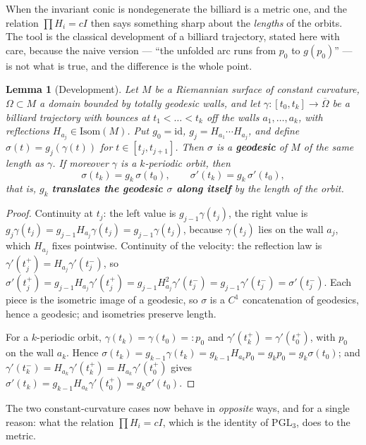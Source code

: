 \documentclass[11pt,a4paper]{article}
\theoremstyle{plain}
\newtheorem{lemma}[theorem]{Lemma}
\theoremstyle{definition}
\theoremstyle{remark}
\newcommand{\PGL}{\mathrm{PGL}}
\begin{document}
When the invariant conic is nondegenerate the billiard is a metric one, and the
relation $\prod H_i=cI$ then says something sharp about the \emph{lengths} of the
orbits. The tool is the classical development of a billiard trajectory, stated here
with care, because the naive version --- ``the unfolded arc runs from $p_0$ to
$g(p_0)$'' --- is not what is true, and the difference is the whole point.

\begin{lemma}[Development]\label{lem:develop}
Let $M$ be a Riemannian surface of constant curvature, $\Omega\subset M$ a domain
bounded by totally geodesic walls, and let $\gamma:[t_0,t_k]\to\overline\Omega$ be a
billiard trajectory with bounces at $t_1<\dots<t_k$ off the walls $a_1,\dots,a_k$,
with reflections $H_{a_j}\in\mathrm{Isom}(M)$. Put $g_0=\mathrm{id}$,
$g_j=H_{a_1}\cdots H_{a_j}$, and define $\sigma(t)=g_j(\gamma(t))$ for
$t\in[t_j,t_{j+1}]$. Then $\sigma$ is a \textbf{geodesic} of $M$ of the same length
as $\gamma$. If moreover $\gamma$ is a $k$-periodic orbit, then
\[
  \sigma(t_k)=g_k\,\sigma(t_0),\qquad \sigma'(t_k)=g_k\,\sigma'(t_0),
\]
that is, $g_k$ \textbf{translates the geodesic $\sigma$ along itself} by the length
of the orbit.
\end{lemma}

\begin{proof}
Continuity at $t_j$: the left value is $g_{j-1}\gamma(t_j)$, the right value is
$g_j\gamma(t_j)=g_{j-1}H_{a_j}\gamma(t_j)=g_{j-1}\gamma(t_j)$, because $\gamma(t_j)$
lies on the wall $a_j$, which $H_{a_j}$ fixes pointwise. Continuity of the velocity:
the reflection law is $\gamma'(t_j^+)=H_{a_j}\gamma'(t_j^-)$, so
$\sigma'(t_j^+)=g_{j-1}H_{a_j}\gamma'(t_j^+)=g_{j-1}H_{a_j}^2\gamma'(t_j^-)
=g_{j-1}\gamma'(t_j^-)=\sigma'(t_j^-)$. Each piece is the isometric image of a
geodesic, so $\sigma$ is a $C^1$ concatenation of geodesics, hence a geodesic; and
isometries preserve length.

For a $k$-periodic orbit, $\gamma(t_k)=\gamma(t_0)=:p_0$ and
$\gamma'(t_k^+)=\gamma'(t_0^+)$, with $p_0$ on the wall $a_k$. Hence
$\sigma(t_k)=g_{k-1}\gamma(t_k)=g_{k-1}H_{a_k}p_0=g_kp_0=g_k\sigma(t_0)$; and
$\gamma'(t_k^-)=H_{a_k}\gamma'(t_k^+)=H_{a_k}\gamma'(t_0^+)$ gives
$\sigma'(t_k)=g_{k-1}H_{a_k}\gamma'(t_0^+)=g_k\sigma'(t_0)$.
\end{proof}

The two constant-curvature cases now behave in \emph{opposite} ways, and for a
single reason: what the relation $\prod H_i=cI$, which is the identity of $\PGL_3$,
does to the metric.
\end{document}
